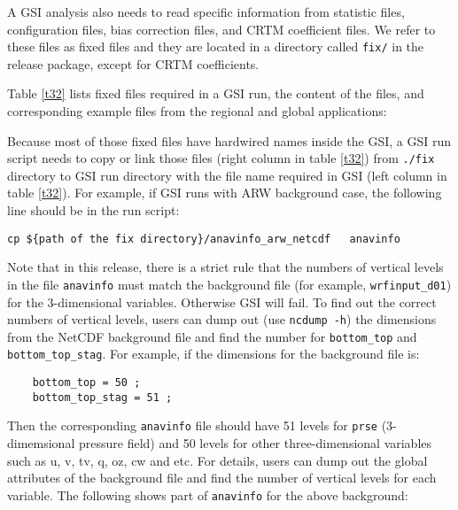 A GSI analysis also needs to read specific information from statistic files, configuration files, bias correction files, and CRTM coefficient files. We refer to these files as fixed files and they are located in a directory called  \verb|fix/| in the release package, except for CRTM coefficients. 

Table \ref{t32}  lists fixed files required in a GSI run, the content of the files, and corresponding example files from the regional and global applications:

Because most of those fixed files have hardwired names inside the GSI, a GSI run script needs to copy or link those files (right column in table \ref{t32})  from \verb|./fix| directory to GSI run directory with the file name required in GSI (left column in table \ref{t32}). For example, if GSI runs with ARW background case, the following line should be in the run script:

\begin{small}
\begin{verbatim}
cp ${path of the fix directory}/anavinfo_arw_netcdf   anavinfo
\end{verbatim}
\end{small}

Note that in this release, there is a strict rule that the numbers of vertical levels in the file \verb|anavinfo| must match the background file (for example, \verb|wrfinput_d01|) for the 3-dimensional variables. Otherwise GSI will fail. To find out the correct numbers of vertical levels, users can dump out (use \verb|ncdump -h|) the dimensions from the NetCDF background file and find the number for \verb|bottom_top| and \verb|bottom_top_stag|. For example, if the dimensions for the background file is:

\begin{small}
\begin{verbatim}
    bottom_top = 50 ;
    bottom_top_stag = 51 ;
\end{verbatim}
\end{small}

Then the corresponding \verb|anavinfo| file should have 51 levels for \verb|prse| (3-dimemsional pressure field) and 50 levels for other three-dimensional variables such as u, v, tv, q, oz, cw and etc. For details, users can dump out the global attributes of the background file and find the number of vertical levels for each variable. The following shows part of \verb|anavinfo| for the above background:

\newpage

